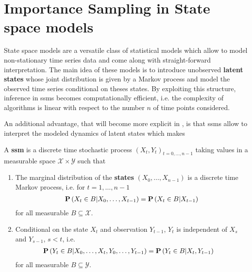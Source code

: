 \glsresetall
\newcommand{\ce}{{\ensuremath{\text{CE}}}}
\newcommand{\pce}{{\ensuremath{\psi_{\text{CE}}}}}
\newcommand{\hpce}{{\ensuremath{\hat\psi_{\text{CE}}}}}
\newcommand{\eis}{{\ensuremath{\text{EIS}}}}
\newcommand{\peis}{{\ensuremath{\psi_{\text{EIS}}}}}
\newcommand{\hpeis}{{\ensuremath{\hat\psi_{\text{EIS}}}}}
\newcommand{\Dto}{\stackrel{\mathcal D}{\to}}
\newcommand{\id}{\operatorname{id}}

\chapter{Importance Sampling in State space models}
\label{cha:state_space_models}

State space models are a versatile class of statistical models which allow to model non-stationary time series data and come along with straight-forward interpretation.
The main idea of these models is to introduce unobserved \textbf{latent states} whose joint distribution is given by a Markov process and model the observed time series conditional on theses states.
By exploiting this structure, inference in \glspl{ssm} becomes computationally efficient, i.e. the complexity of algorithms is linear with respect to the number $n$ of time points considered.

An additional advantage, that will become more explicit in , is that \glspl{ssm} allow to interpret the modeled dynamics of latent states which makes


\begin{definition}
    \label{def:ssm}
    A \textbf{\gls{ssm}} is a discrete time stochastic process $(X_t, Y_t)_{t=0, \dots, n -1}$ taking values in a measurable space $\mathcal X \times \mathcal Y$ such that
    \begin{enumerate}
        \item The marginal distribution of the \textbf{states} $(X_0, \dots, X_{n - 1})$ is a discrete time Markov process, i.e. for $t = 1, \dots, n-1$
              \begin{align}
                  \label{eq:markov_property}
                  \P \left( X_{t} \in B \middle| X_0, \dots, X_{t - 1} \right) = \P \left( X_{t} \in B \middle| X_{t - 1} \right)
              \end{align}
              for all measurable $B \subseteq \mathcal X$.
        \item Conditional on the state $X_t$ and observation $Y_{t - 1}$, $Y_t$ is independent of $X_s$ and $Y_{s - 1}$, $s < t$, i.e.
              \begin{align*}
                  \P \left( Y_{t} \in B \middle| X_{0}, \dots, X_{t}, Y_{0}, \dots, Y_{t - 1} \right) & = \P \left( Y_{t} \in B | X_{t}, Y_{t - 1} \right)
              \end{align*}
              for all measurable $B \subseteq \mathcal{Y}$.
    \end{enumerate}
\end{definition}

